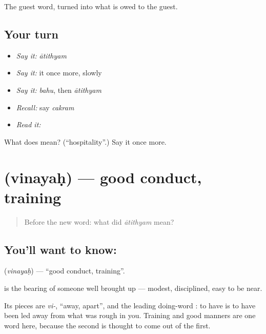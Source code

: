 \begin{grammarlens}[title={What you've built}]
The guest word, turned into what is owed to the guest.
\end{grammarlens}

\subsection*{Your turn}
\begin{itemize}
\raggedright
  \item \emph{Say it:} \emph{ātithyam}
  \item \emph{Say it:} it once more, slowly
  \item \emph{Say it:} \emph{bahu}, then \emph{ātithyam}
  \item \emph{Recall:} say \emph{cakram}
  \item \emph{Read it:} \textbf{}
\end{itemize}

\begin{tcolorbox}[breakable,colback=teal!4,colframe=teal!35!black,title={Before you move on}]
What does  mean? (\textquotedblleft{}hospitality\textquotedblright{}.) Say it once more.
\end{tcolorbox}
\section[\texorpdfstring{\sk{विनयः} (vinayaḥ)}{विनयः (vinayaḥ)}]{ (vinayaḥ) — good conduct, training}

\label{lesson:SA-C43-conduct}



\begin{quote}
Before the new word: what did \emph{ātithyam} mean?
\end{quote}

\subsection*{You'll want to know: }
\textbf{} (\emph{vinayaḥ}) — \textquotedblleft{}good conduct, training\textquotedblright{}.

\textbf{} is the bearing of someone well brought up — modest, disciplined, easy to be near.

Its pieces are \emph{vi-}, \textquotedblleft{}away, apart\textquotedblright{}, and the leading doing-word : to have \textbf{} is to have been led away from what was rough in you. Training and good manners are one word here, because the second is thought to come out of the first.

